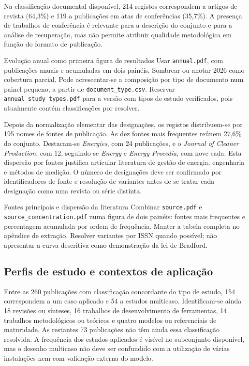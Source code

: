 Na classificação documental disponível, 214 registos correspondem
a artigos de revista (64,3\%) e 119 a publicações em atas de
conferências (35,7\%). A presença de trabalhos de conferência é
relevante para a descrição do conjunto e para a análise de
recuperação, mas não permite atribuir qualidade metodológica
em função do formato de publicação.

{Evolução anual como primeira figura de resultados}
{Usar \texttt{annual.pdf}, com publicações anuais e acumuladas em
dois painéis. Sombrear ou anotar 2026 como cobertura parcial. Pode
acrescentar-se a composição por tipo de documento num painel pequeno,
a partir de \texttt{document\_type.csv}. Reservar
\texttt{annual\_study\_types.pdf} para a versão com tipos de estudo
verificados, pois atualmente contém classificações por resolver.}%

Depois da normalização elementar das designações, os registos
distribuem-se por 195 nomes de fontes de publicação. As dez fontes
mais frequentes reúnem 27,6\% do conjunto. Destacam-se
\emph{Energies}, com 24 publicações, e o \emph{Journal of Cleaner
Production}, com 12, seguindo-se \emph{Energy} e \emph{Energy
Procedia}, com nove cada. Esta dispersão por fontes justifica
articular literatura de gestão de energia, engenharia e métodos
de medição. O número de designações deve ser confirmado por
identificadores de fonte e resolução de variantes antes de se
tratar cada designação como uma revista ou série distinta.

{Fontes principais e dispersão da literatura}
{Combinar \texttt{source.pdf} e \texttt{source\_concentration.pdf}
numa figura de dois painéis: fontes mais frequentes e percentagem
acumulada por ordem de frequência. Manter a tabela completa no
apêndice de extração. Resolver variantes por ISSN quando possível;
não apresentar a curva descritiva como demonstração da lei de Bradford.}%

\subsection{Perfis de estudo e contextos de aplicação}

Entre as 260 publicações com classificação concordante do tipo de
estudo, 154 correspondem a um caso aplicado e 54 a estudos multicaso.
Identificam-se ainda 18 revisões ou sínteses, 16 trabalhos de
desenvolvimento de ferramentas, 14 trabalhos metodológicos ou
teóricos e quatro modelos ou referenciais de maturidade. As restantes
73 publicações não têm ainda essa classificação resolvida. A
frequência dos estudos aplicados é visível no subconjunto disponível,
mas o desenho multicaso não deve ser confundido com a utilização de
várias instalações nem com validação externa do modelo.

